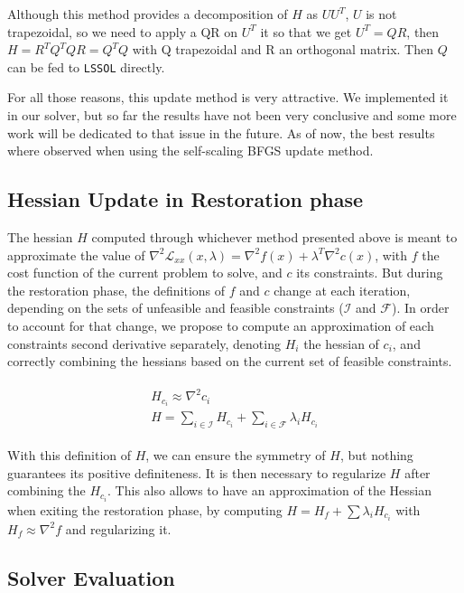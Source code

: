 Although this method provides a decomposition of $H$ as $U U^T$, $U$ is not trapezoidal, so we need to apply a QR on $U^T$ it so that we get $U^T=QR$, then $H=R^T Q^T Q R=Q^T Q$ with Q trapezoidal and R an orthogonal matrix.
Then $Q$ can be fed to {\tt LSSOL} directly.

For all those reasons, this update method is very attractive.
We implemented it in our solver, but so far the results have not been very conclusive and some more work will be dedicated to that issue in the future.
As of now, the best results where observed when using the self-scaling BFGS update method.

\subsection{Hessian Update in Restoration phase}
\label{sub:hessian_update_in_restoration_phase}

The hessian $H$ computed through whichever method presented above is meant to approximate the value of $\nabla^2 \mathcal{L}_{xx}(x,\lambda) = \nabla^2 f(x) + \lambda^T \nabla^2 c(x)$, with $f$ the cost function of the current problem to solve, and $c$ its constraints.
But during the restoration phase, the definitions of $f$ and $c$ change at each iteration, depending on the sets of unfeasible and feasible constraints ($\mathcal{I}$ and $\mathcal{F}$).
In order to account for that change, we propose to compute an approximation of each constraints second derivative separately, denoting $H_i$ the hessian of $c_i$, and correctly combining the hessians based on the current set of feasible constraints.

\begin{align}
  \begin{split}
    H_{c_i} \approx \nabla^2 c_i\\
    H = \sum_{i\in \mathcal{I}}H_{c_i} + \sum_{i\in \mathcal{F}}\lambda_i H_{c_i}
  \end{split}
\end{align}

With this definition of $H$, we can ensure the symmetry of $H$, but nothing guarantees its positive definiteness.
It is then necessary to regularize $H$ after combining the $H_{c_i}$.
This also allows to have an approximation of the Hessian when exiting the restoration phase, by computing $H = H_f + \sum \lambda_i H_{c_i}$ with $H_f \approx \nabla^2 f$ and regularizing it.

\subsection{Solver Evaluation}
\label{sub:solver_evaluation}

